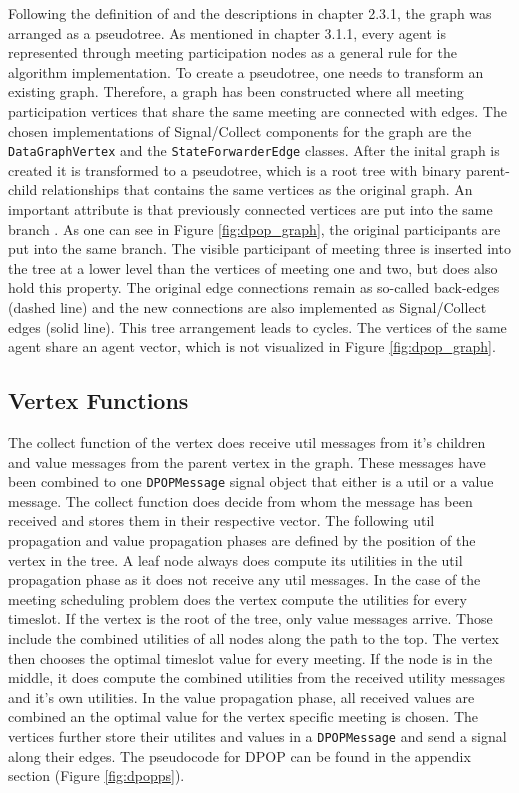 Following the definition of \cite{Petcu2003} and the descriptions in chapter 2.3.1, the graph was arranged as a pseudotree. As mentioned in chapter 3.1.1, every agent is represented through meeting participation nodes as a general rule for the algorithm implementation. To create a pseudotree, one needs to transform an existing graph. Therefore, a graph has been constructed where all meeting participation vertices that share the same meeting are connected with edges. The chosen implementations of Signal/Collect components for the graph are the \texttt{DataGraphVertex} and the \texttt{StateForwarderEdge} classes. After the inital graph is created it is transformed to a pseudotree, which is a root tree with binary parent-child relationships that contains the same vertices as the original graph. An important attribute is that previously connected vertices are put into the same branch \cite{Petcu2003}. As one can see in Figure \ref{fig:dpop_graph}, the original participants are put into the same branch. The visible participant of meeting three is inserted into the tree at a lower level than the vertices of meeting one and two, but does also hold this property. The original edge connections remain as so-called back-edges (dashed line) and the new connections are also implemented as Signal/Collect edges (solid line). This tree arrangement leads to cycles. The vertices of the same agent share an agent vector, which is not visualized in Figure \ref{fig:dpop_graph}.

\subsection{Vertex Functions}
The collect function of the vertex does receive util messages from it's children and value messages from the parent vertex in the graph. These messages have been combined to one \texttt{DPOPMessage} signal object that either is a util or a value message. The collect function does decide from whom the message has been received and stores them in their respective vector. The following util propagation and value propagation phases are defined by the position of the vertex in the tree. 
A leaf node always does compute its utilities in the util propagation phase as it does not receive any util messages. In the case of the meeting scheduling problem does the vertex compute the utilities for every timeslot. If the vertex is the root of the tree, only value messages arrive. Those include the combined utilities of all nodes along the path to the top. The vertex then chooses the optimal timeslot value for every meeting. If the node is in the middle, it does compute the combined utilities from the received utility messages and it's own utilities.
In the value propagation phase, all received values are combined an the optimal value for the vertex specific meeting is chosen. The vertices further store their utilites and values in a \texttt{DPOPMessage} and send a signal along their edges. 
The pseudocode for DPOP can be found in the appendix section (Figure \ref{fig:dpopps}).


